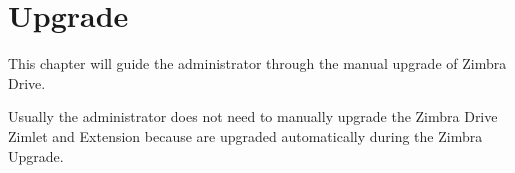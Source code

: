 \chapter{Upgrade}
This chapter will guide the administrator through the manual upgrade of Zimbra Drive.
\begin{warning}
    Usually the administrator does not need to manually upgrade the Zimbra Drive Zimlet 
    and Extension because are upgraded automatically during the Zimbra Upgrade.
\end{warning}




